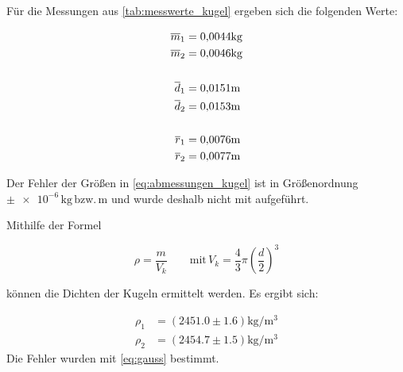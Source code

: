 Für die Messungen aus \ref{tab:messwerte_kugel} ergeben sich die
folgenden Werte:

\begin{align} %
\label{eq:abmessungen_kugel}
\begin{aligned}
\overline{m}_{1}&=  \num{0.0044}\si{\kilogram} \\
\overline{m}_{2}&= \num{0.0046} \si{\kilogram} \\
\hfill \\
\overline{d}_{1}&= \num{0.0151}\si{\meter} \\
\overline{d}_{2}&= \num{0.0153} \si{\meter} \\
\hfill\\
\overline{r}_{1}&= \num{0.0076}\si{\meter} \\
\overline{r}_{2}&= \num{0.0077} \si{\meter} \\
\end{aligned}
\end{align}

Der Fehler der Größen in \eqref{eq:abmessungen_kugel} ist in Größenordnung $\pm \num{e-6}\, \si{\kilogram}\,\text{bzw.}\, \si{\meter}$
und wurde deshalb nicht mit aufgeführt.

Mithilfe der Formel%

\begin{equation*}
\rho=\frac{m}{V_{k}} \qquad \text{mit} \, V_{k}=\frac{4}{3}\pi \left(\frac{d}{2}\right)^3
\end{equation*}

können die Dichten der Kugeln ermittelt werden.
Es ergibt sich:

\begin{align*}
\rho_{1}&=\left(\num{2451.0}\pm\num{1.6}\right) \si{\kilogram\per\cubic\meter}\\
\rho_{2}&=\left(\num{2454.7}\pm\num{1.5}\right) \si{\kilogram\per\cubic\meter}
\end{align*}
Die Fehler wurden mit \eqref{eq:gauss} bestimmt.
